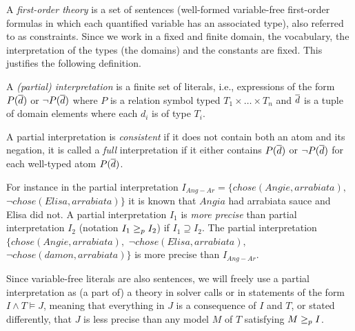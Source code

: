A \emph{first-order theory} is a set of sentences (well-formed variable-free first-order formulas in which each quantified variable has an associated type), also referred to as constraints.
Since we work in a fixed and finite domain, the vocabulary, the interpretation of the types (the domains) and the constants are fixed.
This justifies the following definition. 
\begin{definition}
 A \emph{(partial) interpretation} is a finite set of literals, i.e., expressions of the form $P(\overline{d})$ or $\lnot P(\overline{d})$ where $P$ is a relation symbol typed $T_1\times\dots \times T_n$ and $\overline{d}$ is a tuple of domain elements where each $d_i$ is of type $T_i$. 

 A partial interpretation is \emph{consistent} if it does not contain both an atom and its negation, it is called a \emph{full} interpretation if it either contains $P(\overline{d})$ or $\lnot P(\overline{d})$ for each well-typed atom $P(\overline{d})$. 
\end{definition}
For instance in the partial interpretation $I_{Ang-Ar}=\{chose(Angie,arrabiata),$ $\lnot chose(Elisa,arrabiata)\}$ it is known that $Angia$ had arrabiata sauce and Elisa did not. 
% 
A partial interpretation $I_1$ is \emph{more precise} than partial interpretation $I_2$ (notation $I_1\geq_p I_2$) if $I_1\supseteq I_2$.
The partial interpretation $\{chose(Angie,arrabiata),$ $\lnot chose(Elisa,arrabiata),$ $ \lnot chose(damon,arrabiata)\}$ is more precise than $I_{Ang-Ar}$. 

Since variable-free literals are also sentences, we will freely use a partial interpretation as (a part of) a theory in solver calls or in statements of the form $I\land T \models J$, meaning that everything in $J$ is a consequence of $I$ and $T$, or stated differently, that $J$ is less precise than any model $M$ of $T$ satisfying $M\geq_p I$. 

